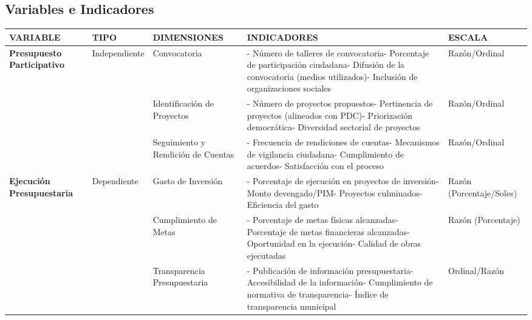 \documentclass[
  man,
  floatsintext,
  longtable,
  a4paper,
  nolmodern,
  notxfonts,
  notimes,
  12pt,
  colorlinks=true,linkcolor=blue,citecolor=blue,urlcolor=blue]{apa7}
\newcounter{none} %
\begin{document}
\subsection{Variables e Indicadores}\label{variables-e-indicadores-6}

{\def\LTcaptype{none} %
\begin{longtable}[]{@{}
  >{\raggedright\arraybackslash}p{}
  >{\raggedright\arraybackslash}p{}
  >{\raggedright\arraybackslash}p{}
  >{\raggedright\arraybackslash}p{}
  >{\raggedright\arraybackslash}p{}@{}}
\toprule\noalign{}
\begin{minipage}[b]{\linewidth}\raggedright
VARIABLE
\end{minipage} & \begin{minipage}[b]{\linewidth}\raggedright
TIPO
\end{minipage} & \begin{minipage}[b]{\linewidth}\raggedright
DIMENSIONES
\end{minipage} & \begin{minipage}[b]{\linewidth}\raggedright
INDICADORES
\end{minipage} & \begin{minipage}[b]{\linewidth}\raggedright
ESCALA
\end{minipage} \\
\midrule\noalign{}
\endhead
\bottomrule\noalign{}
\endlastfoot
\textbf{Presupuesto Participativo} & Independiente & Convocatoria & -
Número de talleres de convocatoria- Porcentaje de participación
ciudadana- Difusión de la convocatoria (medios utilizados)- Inclusión de
organizaciones sociales & Razón/Ordinal \\
& & Identificación de Proyectos & - Número de proyectos propuestos-
Pertinencia de proyectos (alineados con PDC)- Priorización democrática-
Diversidad sectorial de proyectos & Razón/Ordinal \\
& & Seguimiento y Rendición de Cuentas & - Frecuencia de rendiciones de
cuentas- Mecanismos de vigilancia ciudadana- Cumplimiento de acuerdos-
Satisfacción con el proceso & Razón/Ordinal \\
\textbf{Ejecución Presupuestaria} & Dependiente & Gasto de Inversión & -
Porcentaje de ejecución en proyectos de inversión- Monto devengado/PIM-
Proyectos culminados- Eficiencia del gasto & Razón (Porcentaje/Soles) \\
& & Cumplimiento de Metas & - Porcentaje de metas físicas alcanzadas-
Porcentaje de metas financieras alcanzadas- Oportunidad en la ejecución-
Calidad de obras ejecutadas & Razón (Porcentaje) \\
& & Transparencia Presupuestaria & - Publicación de información
presupuestaria- Accesibilidad de la información- Cumplimiento de
normativa de transparencia- Índice de transparencia municipal &
Ordinal/Razón \\
\end{longtable}
}
\end{document}
